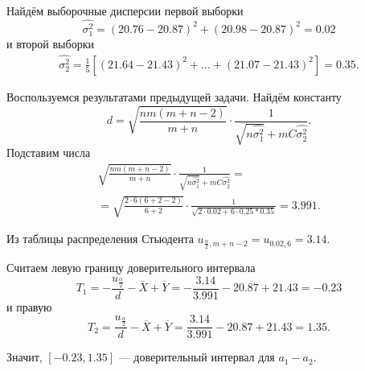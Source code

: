 Найдём выборочные дисперсии первой выборки
$$ \hat{ \sigma_1^2} =
  \left( 20.76 - 20.87 \right)^2 + \left( 20.98 - 20.87 \right)^2 =
  0.02$$
и второй выборки
\begin{equation*}
  \begin{split}
    \hat{ \sigma_2^2} =
    \frac{1}{5} \left[
      \left(21.64 - 21.43 \right)^2 + \dotsc + \left(21.07 - 21.43 \right)^2
    \right] =
    0.35.
  \end{split}
\end{equation*}

Воспользуемся результатами предыдущей задачи.
Найдём константу
$$d =
  \sqrt{ \frac{nm \left( m + n - 2 \right) }{m + n}} \cdot
  \frac{1}{ \sqrt{n \hat{ \sigma_1^2}} + mC \hat{ \sigma_2^2}}.$$
Подставим числа
\begin{equation*}
  \begin{split}
    \sqrt{ \frac{nm \left( m + n - 2 \right) }{m + n}} \cdot
    \frac{1}{ \sqrt{n \hat{ \sigma_1^2}} + mC \hat{ \sigma_2^2}} = \\
    = \sqrt{ \frac{2 \cdot 6 \left( 6 + 2 - 2 \right) }{6 + 2}} \cdot
    \frac{1}{ \sqrt{2 \cdot 0.02 + 6 \cdot 0.25 * 0.35}} =
    3.991.
  \end{split}
\end{equation*}

Из таблицы распределения Стьюдента $u_{ \frac{ \alpha }{2}, m + n - 2} = u_{0.02, 6} = 3.14$.

Считаем левую границу доверительного интервала
$$T_1 =
  - \frac{u_{ \frac{ \alpha }{2}}}{d} - \overline{X} + \overline{Y} =
  - \frac{3.14}{3.991} - 20.87 + 21.43 =
  -0.23$$
и правую
$$T_2 =
  \frac{u_{ \frac{ \alpha }{2}}}{d} - \overline{X} + \overline{Y} =
  \frac{3.14}{3.991} - 20.87 + 21.43 =
  1.35.$$

Значит, $ \left[ -0.23, 1.35 \right] $ --- доверительный интервал для $a_1 - a_2$.
